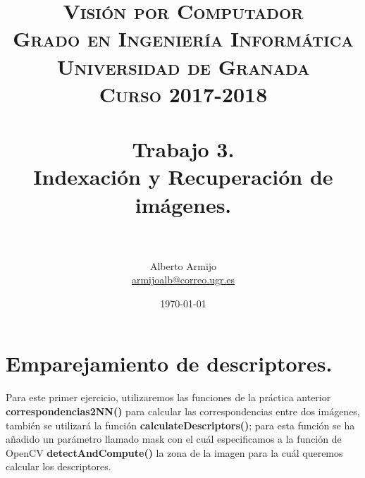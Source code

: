 

\title{	
	\normalfont \normalsize 
	\textsc{\textbf{Visión por Computador} \\ Grado en Ingeniería Informática \\ Universidad de Granada \\
	Curso 2017-2018} \\ [25pt] %
	\horrule{0.5pt} \\[0.4cm] %
	\huge Trabajo 3. \\
	\huge Indexación y Recuperación de imágenes.
	\\ %
	\horrule{2pt} \\[0.5cm] %
}

\author{Alberto Armijo  \\
\href{mailto:armijoalb@correo.ugr.es}{armijoalb@correo.ugr.es}} %
\date{\normalsize\today} %



	
	\maketitle %
	
	\newpage %
	
	\tableofcontents %
	
	\listoffigures %
	
	\newpage
	
	\section[Ejercicio 1]{Emparejamiento de descriptores.}
	Para este primer ejercicio, utilizaremos las funciones de la práctica anterior \textbf{correspondencias2NN()} para calcular las correspondencias entre dos imágenes, también se utilizará la función \textbf{calculateDescriptors()}; para esta función se ha añadido un parámetro llamado mask con el cuál especificamos a la función de OpenCV \textbf{detectAndCompute()} la zona de la imagen para la cuál queremos calcular los descriptores.
	
